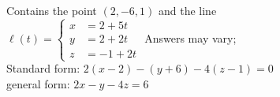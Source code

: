 {Contains the point $(2,-6,1)$ and the line\\
$\ell(t) = \left\{\begin{aligned} x&=2+5t \\
																	y&=2+2t \\
																	z&=-1+2t \end{aligned}\right.$
}
{Answers may vary;\\
Standard form: $2(x-2)-(y+6)-4(z-1)=0$\\
general form: $2x-y-4z=6$
}

